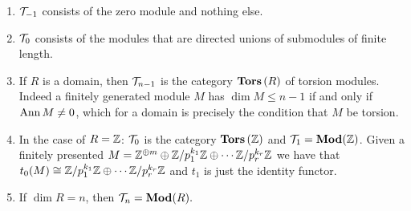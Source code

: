 \documentclass[runningheads]{llncs}
\begin{document}
\begin{example}
\begin{enumerate}
\item
$\mathcal T_{-1}$ consists of the zero module and nothing else.
\item
$\mathcal T_0$ consists of the modules that are directed unions of submodules of finite length.
\item
If $R$ is a domain, then $\mathcal T_{n-1}$ is the category $ \operatorname{\mathbf{Tors}}{(R)}$ of torsion modules. Indeed a finitely generated module $M$ has $\dim M \leq n-1$ if and only if $\operatorname{Ann} M \neq 0$, which for a domain is precisely the condition that $M$ be torsion.
\item
In the case of $R = \mathbb{Z}$: $\mathcal T_0$ is the category $\operatorname{\mathbf{Tors}}{(\mathbb{Z})}$ and $\mathcal T_1 = \operatorname{\mathbf{Mod}}(\mathbb{Z})$. Given  a finitely presented $M = \mathbb{Z}^{\oplus m} \oplus \mathbb{Z}/p_1^{k_1}\mathbb{Z} \oplus \cdots \mathbb{Z}/p_r^{k_r}\mathbb{Z} $ we have that $t_0(M) \cong \mathbb{Z}/p_1^{k_1}\mathbb{Z} \oplus \cdots \mathbb{Z}/p_r^{k_r}\mathbb{Z}$  and $t_1$ is just the identity functor.
\item 
If $\dim R = n$, then $\mathcal T_n = \operatorname{\mathbf{Mod}}(R).$
\end{enumerate}
\end{example}
\end{document}
